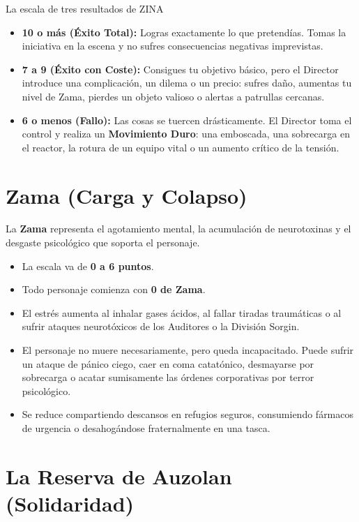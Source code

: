 \begin{CajaRegla}{La escala de tres resultados de ZINA}
\begin{itemize}
  \item \textbf{10 o más (Éxito Total):} Logras exactamente lo que pretendías. Tomas la iniciativa en la escena y no sufres consecuencias negativas imprevistas.
  \item \textbf{7 a 9 (Éxito con Coste):} Consigues tu objetivo básico, pero el Director introduce una complicación, un dilema o un precio: sufres daño, aumentas tu nivel de Zama, pierdes un objeto valioso o alertas a patrullas cercanas.
  \item \textbf{6 o menos (Fallo):} Las cosas se tuercen drásticamente. El Director toma el control y realiza un \textbf{Movimiento Duro}: una emboscada, una sobrecarga en el reactor, la rotura de un equipo vital o un aumento crítico de la tensión.
\end{itemize}
\end{CajaRegla}

\section{Zama (Carga y Colapso)}

La \textbf{Zama} representa el agotamiento mental, la acumulación de neurotoxinas y el desgaste psicológico que soporta el personaje.
\begin{itemize}
  \item La escala va de \textbf{0 a 6 puntos}.
  \item Todo personaje comienza con \textbf{0 de Zama}.
  \item El estrés aumenta al inhalar gases ácidos, al fallar tiradas traumáticas o al sufrir ataques neurotóxicos de los Auditores o la División Sorgin.
  \item {} El personaje no muere necesariamente, pero queda incapacitado. Puede sufrir un ataque de pánico ciego, caer en coma catatónico, desmayarse por sobrecarga o acatar sumisamente las órdenes corporativas por terror psicológico.
  \item {} Se reduce compartiendo descansos en refugios seguros, consumiendo fármacos de urgencia o desahogándose fraternalmente en una tasca.
\end{itemize}

\section{La Reserva de Auzolan (Solidaridad)}

